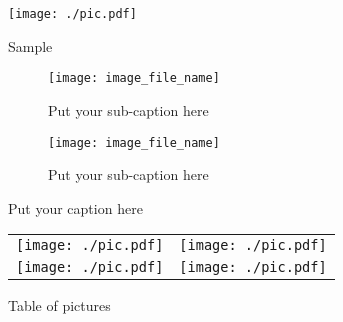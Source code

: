 \documentclass[a4paper]{article}
\begin{document}
\begin{figure}[h]
  \centering
  \texttt{[image: ./pic.pdf]}%
  \caption{Sample}
  \label{fig:pdf}
\end{figure}

\usepackage{subcaption}
\begin{figure}[ht]
\begin{subfigure}{.5\textwidth}
  \centering
  \texttt{[image: image\_file\_name]}  
  \caption{Put your sub-caption here}
  \label{fig:sub-first}
\end{subfigure}
\begin{subfigure}{.5\textwidth}
  \centering
  \texttt{[image: image\_file\_name]}  
  \caption{Put your sub-caption here}
  \label{fig:sub-second}
\end{subfigure}
\caption{Put your caption here}
\label{fig:fig}
\end{figure}

\begin{figure}[h!]
  \begin{tabular}{cc}
    \begin{minipage}{0.5\hsize}
      \centering
      \texttt{[image: ./pic.pdf]}
    \end{minipage} &
    \begin{minipage}{0.5\hsize}
      \centering
      \texttt{[image: ./pic.pdf]}
    \end{minipage} \\
    \begin{minipage}{0.5\hsize}
      \centering
      \texttt{[image: ./pic.pdf]}
    \end{minipage} &
    \begin{minipage}{0.5\hsize}
      \centering
      \texttt{[image: ./pic.pdf]}
    \end{minipage} \\
  \end{tabular}
  \caption{Table of pictures}
  \label{fig:table}
\end{figure}
\end{document}
